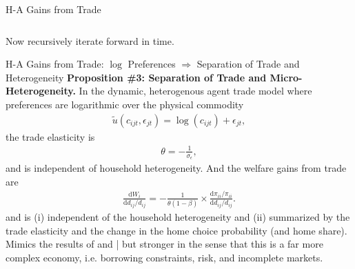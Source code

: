 \documentclass[9pt,pdftex,aspectratio=1610]{beamer}
\theoremstyle{definition}
\begin{document}
\begin{frame}[t]{H-A Gains from Trade }
{\begin{align*}
\end{align*}\\
\bigskip
\medskip
Now recursively iterate forward in time.
}
\end{frame}


\begin{frame}[t]{H-A Gains from Trade: $\log$ Preferences $\Rightarrow$ Separation of Trade and Heterogeneity}
\smallskip
\textbf{Proposition \#3: Separation of Trade and Micro-Heterogeneity.} In the dynamic, heterogenous agent trade model where preferences are logarithmic over the physical commodity
\begin{align}
\tilde{u}( c_{ijt}, \epsilon_{jt} ) =  \log(c_{ijt}) + \epsilon_{jt}, \nonumber
\end{align}
the trade elasticity is
\begin{align}
\theta = -\frac{1}{\sigma_{\epsilon}}, \nonumber
\end{align}
and is independent of household heterogeneity. And the welfare gains from trade are
\begin{align}
\frac{\mathrm{d} W_{i}}{\mathrm{d} d_{ij} / d_{ij}} = -\frac{1}{\theta (1-\beta)} \times \frac{\mathrm{d} \pi_{ii} / \pi_{ii}}{\mathrm{d}d_{ij} / d_{ij}}. \nonumber
\end{align}
and is (i) independent of the household heterogeneity and (ii) summarized by the trade elasticity and the change in the home choice probability (and home share).\\
\bigskip
\medskip
Mimics the results of \citet{anderson1987ces} and \citet{arkolakis2012new}| but stronger in the sense that this is a far more complex economy, i.e. borrowing constraints, risk, and incomplete markets.
\end{frame}
\end{document}
